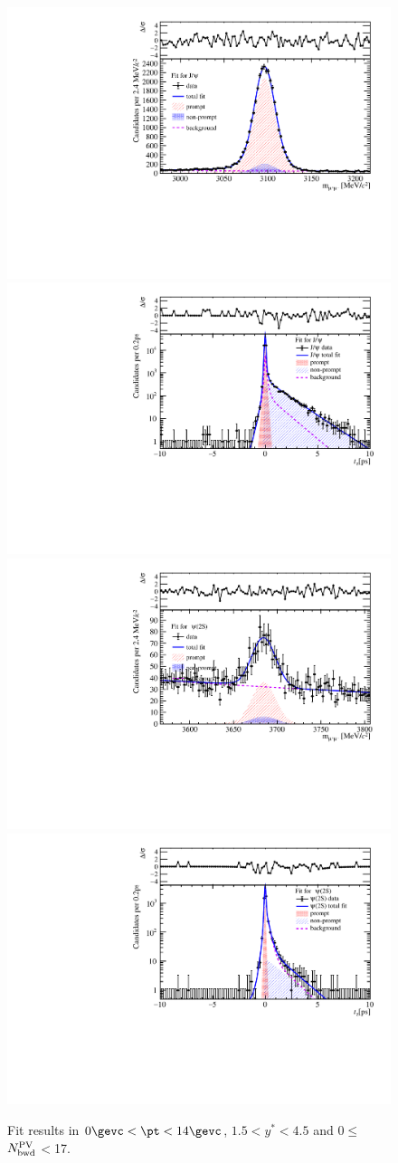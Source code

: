 \begin{figure}[H]
\begin{center}
\includegraphics[width=0.45\linewidth]{pdf/Pbp/BWorkdir/TwoDimFit/ProjMass/Jpsi_n1y1pt1.pdf}
\includegraphics[width=0.45\linewidth]{pdf/Pbp/BWorkdir/TwoDimFit/ProjTz/Jpsi_n1y1pt1.pdf}
\vspace*{-0.5cm}
\includegraphics[width=0.45\linewidth]{pdf/Pbp/BWorkdir/TwoDimFit/ProjMass/Psi2S_n1y1pt1.pdf}
\includegraphics[width=0.45\linewidth]{pdf/Pbp/BWorkdir/TwoDimFit/ProjTz/Psi2S_n1y1pt1.pdf}
\vspace*{-0.5cm}
\end{center}
\caption{Fit results in $0\gevc<\pt<14\gevc$, $1.5<y^*<4.5$ and 0$\leq$$N_{\rm bwd}^{\rm PV}$$<$17.}
\end{figure}

